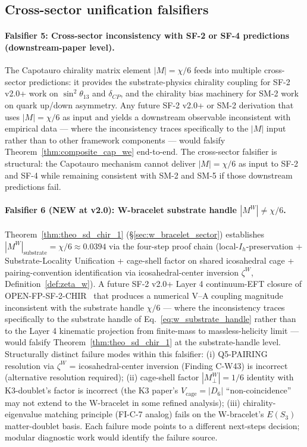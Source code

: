 \documentclass[11pt,letterpaper]{article}
\newcommand{\Dsix}{D_6}
\newcommand{\Sthree}{S_3}
\begin{document}
\subsection{Cross-sector unification falsifiers}\label{sec:falsifier_cross_sector}

\paragraph{Falsifier 5: Cross-sector inconsistency with SF-2 or SF-4 predictions (downstream-paper level).}
The Capotauro chirality matrix element $|M| = \chi/6$ feeds into multiple cross-sector predictions: it provides the substrate-physics chirality coupling for SF-2 v2.0+ work on $\sin^2\theta_{13}$ and $\delta_{CP}$, and the chirality bias machinery for SM-2 work on quark up/down asymmetry. Any future SF-2 v2.0+ or SM-2 derivation that uses $|M| = \chi/6$ as input and yields a downstream observable inconsistent with empirical data --- where the inconsistency traces specifically to the $|M|$ input rather than to other framework components --- would falsify Theorem~\ref{thm:composite_cap_we} end-to-end. The cross-sector falsifier is structural: the Capotauro mechanism cannot deliver $|M| = \chi/6$ as input to SF-2 and SF-4 while remaining consistent with SM-2 and SM-5 if those downstream predictions fail.

\paragraph{Falsifier 6 (NEW at v2.0): W-bracelet substrate handle $|M^W| \neq \chi/6$.}
Theorem~\ref{thm:theo_sd_chir_1} (\S\ref{sec:w_bracelet_sector}) establishes $|M^W|_{\text{substrate}} = \chi/6 \approx 0.0394$ via the four-step proof chain (local-$I_h$-preservation + Substrate-Locality Unification + cage-shell factor on shared icosahedral cage + pairing-convention identification via icosahedral-center inversion $\zeta^W$, Definition~\ref{def:zeta_w}). A future SF-2 v2.0+ Layer 4 continuum-EFT closure of OPEN-FP-SF-2-CHIR~\cite{abshier_sf2,abshier_research_frontier} that produces a numerical V--A coupling magnitude inconsistent with the substrate handle $\chi/6$ --- where the inconsistency traces specifically to the substrate handle of Eq.~\eqref{eq:w_substrate_handle} rather than to the Layer 4 kinematic projection from finite-mass to massless-helicity limit --- would falsify Theorem~\ref{thm:theo_sd_chir_1} at the substrate-handle level. Structurally distinct failure modes within this falsifier: (i) Q5-PAIRING resolution via $\zeta^W$ = icosahedral-center inversion (Finding C-W43) is incorrect (alternative resolution required); (ii) cage-shell factor $|M_\perp^W| = 1/6$ identity with K3-doublet's factor is incorrect (the K3 paper's $V_{\text{cage}} = |\Dsix|$ ``non-coincidence'' may not extend to the W-bracelet in some refined analysis); (iii) chirality-eigenvalue matching principle (FI-C-7 analog) fails on the W-bracelet's $E(\Sthree)$ matter-doublet basis. Each failure mode points to a different next-steps decision; modular diagnostic work would identify the failure source.
\end{document}
